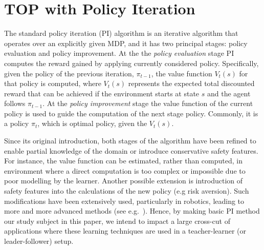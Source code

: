 
\section{TOP with Policy Iteration}\label{sec: TOP-PI}
The standard policy iteration (PI) algorithm is an iterative algorithm
that operates over an explicitly given MDP\cite{puterman_book_94}, and
it has two principal stages: policy evaluation and policy
improvement. At the the {\em policy evaluation} stage PI computes the
reward gained by applying currently considered policy. Specifically,
given the policy of the previous iteration, $\pi_{t-1}$, the value
function $V_t(s)$ for that policy is computed, where $V_t(s)$
represents the expected total discounted reward that can be achieved
if the environment starts at state $s$ and the agent follows
$\pi_{t-1}$. At the {\em policy improvement} stage the value function
of the current policy is used to guide the computation of the next
stage policy. Commonly, it is a policy $\pi_{t}$, which is optimal
policy, given the $V_t(s)$.

Since its original introduction, both stages of the algorithm have
been refined to enable partial knowledge of the domain or introduce
conservative safety features. For instance, the value function can be
estimated, rather than computed, in environment where a direct
computation is too complex or impossible due to poor modelling by the
learner. Another possible extension is introduction of safety features
into the calculations of the new policy (e.g risk aversion). Such
modifications have been extensively used, particularly in robotics,
leading to more and more advanced methods (see
e.g.~\cite{sugiyama_et_al_2009}). Hence, by making basic PI method our
study subject in this paper, we intend to impact a large cross-cut of
applications where these learning techniques are used in a
teacher-learner (or leader-follower) setup.

